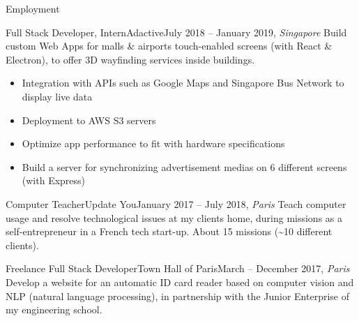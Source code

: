 \documentclass[]{mcdowellcv}
\begin{document}
    \begin{cvsection}{Employment}

        \begin{cvsubsection}{Full Stack Developer, Intern}{Adactive}{July 2018 -- January 2019, \textit{Singapore}}
            Build custom Web Apps for malls \& airports touch-enabled screens (with React \& Electron), to offer 3D wayfinding services inside buildings.
            \begin{itemize}
                \item Integration with APIs such as Google Maps and Singapore Bus Network to display live data
                \item Deployment to AWS S3 servers
                \item Optimize app performance to fit with hardware specifications
                \item Build a server for synchronizing advertisement medias on 6 different screens (with Express)
            \end{itemize}
        \end{cvsubsection}

        \begin{cvsubsection}{Computer Teacher}{Update You}{January 2017 -- July 2018, \textit{Paris}}
            Teach computer usage and resolve technological issues at my clients home, during missions as a self-entrepreneur in a French tech start-up.
            About 15 missions (\textasciitilde 10 different clients).
        \end{cvsubsection}

        \begin{cvsubsection}{Freelance Full Stack Developer}{Town Hall of Paris}{March -- December 2017, \textit{Paris}}
            Develop a website for an automatic ID card reader based on computer vision and NLP (natural language processing), in partnership with the Junior Enterprise of my engineering school.
        \end{cvsubsection}

    \end{cvsection}
\end{document}
